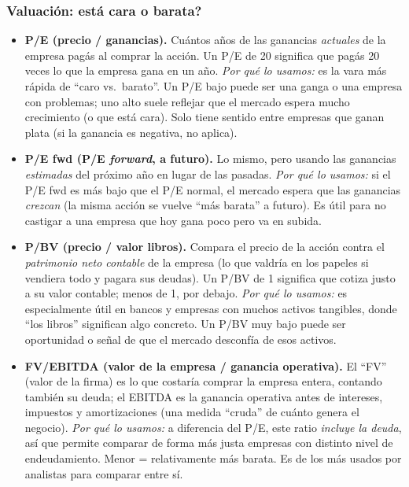\documentclass[11pt,a4paper]{article}
\begin{document}
\subsubsection*{Valuaci\'on: \textquestiondown{}est\'a cara o barata?}

\begin{itemize}[leftmargin=1.4em]
  \item \textbf{P/E (precio / ganancias).} Cu\'antos a\~nos de las ganancias
  \emph{actuales} de la empresa pag\'as al comprar la acci\'on. Un P/E de 20 significa
  que pag\'as 20 veces lo que la empresa gana en un a\~no. \emph{Por qu\'e lo usamos:}
  es la vara m\'as r\'apida de ``caro vs.\ barato''. Un P/E bajo puede ser una ganga o
  una empresa con problemas; uno alto suele reflejar que el mercado espera mucho
  crecimiento (o que est\'a cara). Solo tiene sentido entre empresas que ganan plata
  (si la ganancia es negativa, no aplica).
  \item \textbf{P/E fwd (P/E \emph{forward}, a futuro).} Lo mismo, pero usando las
  ganancias \emph{estimadas} del pr\'oximo a\~no en lugar de las pasadas. \emph{Por
  qu\'e lo usamos:} si el P/E fwd es m\'as bajo que el P/E normal, el mercado espera
  que las ganancias \emph{crezcan} (la misma acci\'on se vuelve ``m\'as barata'' a
  futuro). Es \'util para no castigar a una empresa que hoy gana poco pero va en
  subida.
  \item \textbf{P/BV (precio / valor libros).} Compara el precio de la acci\'on contra
  el \emph{patrimonio neto contable} de la empresa (lo que valdr\'ia en los papeles si
  vendiera todo y pagara sus deudas). Un P/BV de 1 significa que cotiza justo a su
  valor contable; menos de 1, por debajo. \emph{Por qu\'e lo usamos:} es especialmente
  \'util en bancos y empresas con muchos activos tangibles, donde ``los libros''
  significan algo concreto. Un P/BV muy bajo puede ser oportunidad o se\~nal de que el
  mercado desconf\'ia de esos activos.
  \item \textbf{FV/EBITDA (valor de la empresa / ganancia operativa).} El ``FV'' (valor
  de la firma) es lo que costar\'ia comprar la empresa entera, contando tambi\'en su
  deuda; el EBITDA es la ganancia operativa antes de intereses, impuestos y
  amortizaciones (una medida ``cruda'' de cu\'anto genera el negocio). \emph{Por qu\'e
  lo usamos:} a diferencia del P/E, este ratio \emph{incluye la deuda}, as\'i que
  permite comparar de forma m\'as justa empresas con distinto nivel de endeudamiento.
  Menor = relativamente m\'as barata. Es de los m\'as usados por analistas para comparar
  entre s\'i.
\end{itemize}
\end{document}
